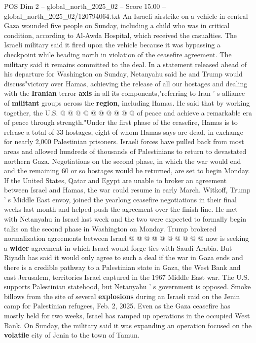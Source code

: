 \begin{textsample}{POS Dim 2 – global\_north\_2025\_02 – Score 15.00 – global\_north\_2025\_02/120794064.txt}
An Israeli airstrike on a vehicle in central Gaza wounded five people on Sunday, including a child who was in critical condition, according to Al-Awda Hospital, which received the casualties.
The Israeli military said it fired upon the vehicle because it was bypassing a checkpoint while heading north in violation of the ceasefire agreement.
The military said it remains committed to the deal.
In a statement released ahead of his departure for Washington on Sunday, Netanyahu said he and Trump would discuss"victory over Hamas, achieving the release of all our hostages and dealing with the \textbf{Iranian} terror \textbf{axis} in all its components,"referring to Iran ' s alliance of \textbf{militant} groups across the \textbf{region}, including Hamas.
He said that by working together, the U.S. @ @ @ @ @ @ @ @ @ @ of peace and achieve a remarkable era of peace through strength."Under the first phase of the ceasefire, Hamas is to release a total of 33 hostages, eight of whom Hamas says are dead, in exchange for nearly 2,000 Palestinian prisoners.
Israeli forces have pulled back from most areas and allowed hundreds of thousands of Palestinians to return to devastated northern Gaza.
Negotiations on the second phase, in which the war would end and the remaining 60 or so hostages would be returned, are set to begin Monday.
If the United States, Qatar and Egypt are unable to broker an agreement between Israel and Hamas, the war could resume in early March.
Witkoff, Trump ' s Middle East envoy, joined the yearlong ceasefire negotiations in their final weeks last month and helped push the agreement over the finish line.
He met with Netanyahu in Israel last week and the two were expected to formally begin talks on the second phase in Washington on Monday.
Trump brokered normalization agreements between Israel @ @ @ @ @ @ @ @ @ @ now is seeking a \textbf{wider} agreement in which Israel would forge ties with Saudi Arabia.
But Riyadh has said it would only agree to such a deal if the war in Gaza ends and there is a credible pathway to a Palestinian state in Gaza, the West Bank and east Jerusalem, territories Israel captured in the 1967 Middle East war.
The U.S. supports Palestinian statehood, but Netanyahu ' s government is opposed.
Smoke billows from the site of several \textbf{explosions} during an Israeli raid on the Jenin camp for Palestinian refugees, Feb. 2, 2025.
Even as the Gaza ceasefire has mostly held for two weeks, Israel has ramped up operations in the occupied West Bank.
On Sunday, the military said it was expanding an operation focused on the \textbf{volatile} city of Jenin to the town of Tamun.

\end{textsample}
